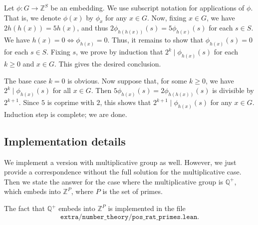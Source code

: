 \documentclass{article}
\newcommand{\Z}{\mathbb{Z}}
\newcommand{\Q}{\mathbb{Q}}
\begin{document}
Let $\phi : G \to \Z^S$ be an embedding.
We use subscript notation for applications of $\phi$.
That is, we denote $\phi(x)$ by $\phi_x$ for any $x \in G$.
Now, fixing $x \in G$, we have $2 h(h(x)) = 5 h(x)$, and thus $2 \phi_{h(h(x))}(s) = 5 \phi_{h(x)}(s)$ for each $s \in S$.
We have $h(x) = 0 \iff \phi_{h(x)} = 0$.
Thus, it remains to show that $\phi_{h(x)}(s) = 0$ for each $s \in S$.
Fixing $s$, we prove by induction that $2^k \mid \phi_{h(x)}(s)$ for each $k \geq 0$ and $x \in G$.
This gives the desired conclusion.

The base case $k = 0$ is obvious.
Now suppose that, for some $k \geq 0$, we have $2^k \mid \phi_{h(x)}(s)$ for all $x \in G$.
Then $5 \phi_{h(x)}(s) = 2 \phi_{h(h(x))}(s)$ is divisible by $2^{k + 1}$.
Since $5$ is coprime with $2$, this shows that $2^{k + 1} \mid  \phi_{h(x)}(s)$ for any $x \in G$.
Induction step is complete; we are done.



\subsection*{Implementation details}

We implement a version with multiplicative group as well.
However, we just provide a correspondence without the full solution for the multiplicative case.
Then we state the answer for the case where the multiplicative group is $\Q^+$, which embeds into $\Z^P$, where $P$ is the set of primes.

The fact that $\Q^+$ embeds into $\Z^P$ is implemented in the file
\[ \texttt{extra/number\_theory/pos\_rat\_primes.lean}. \]
\end{document}
